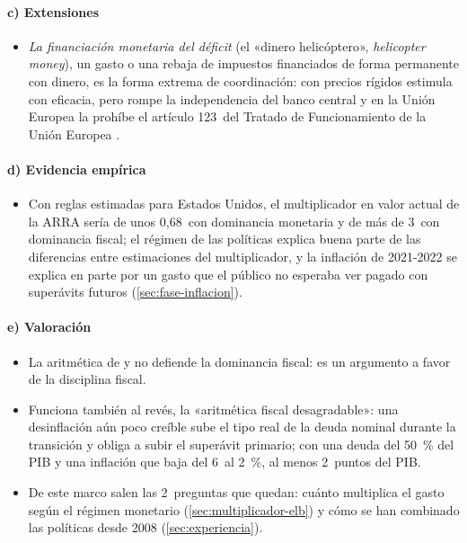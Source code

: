 \documentclass[11pt]{article}
\begin{document}
\paragraph{c) Extensiones}

\begin{itemize}
\item \emph{La financiación monetaria del déficit} (el «dinero helicóptero», \emph{helicopter money}), un gasto o una rebaja de impuestos financiados de forma permanente con dinero, es la forma extrema de coordinación: con precios rígidos estimula con eficacia\nocite{Gali2020Effects}, pero rompe la independencia del banco central y en la Unión Europea la prohíbe el artículo 123~del Tratado de Funcionamiento de la Unión Europea .
\end{itemize}

\paragraph{d) Evidencia empírica}

\begin{itemize}
\item Con reglas estimadas para Estados Unidos, el multiplicador en valor actual de la ARRA sería de unos 0,68~con dominancia monetaria y de más de 3~con dominancia fiscal\nocite{DavigLeeper2011Monetary}; el régimen de las políticas explica buena parte de las diferencias entre estimaciones del multiplicador\nocite{LeeperTraumWalker2017}, y la inflación de 2021-2022 se explica en parte por un gasto que el público no esperaba ver pagado con superávits futuros\nocite{BianchiFacciniMelosi2023} (\ref{sec:fase-inflacion}).
\end{itemize}

\paragraph{e) Valoración}

\begin{itemize}
\item La aritmética de  y  no defiende la dominancia fiscal: es un argumento a favor de la disciplina fiscal.
\item Funciona también al revés, la «aritmética fiscal desagradable»: una desinflación aún poco creíble sube el tipo real de la deuda nominal durante la transición y obliga a subir el superávit primario; con una deuda del 50~\% del PIB y una inflación que baja del 6~al 2~\%, al menos 2~puntos del PIB\nocite{King1995Commentary}.
\item De este marco salen las 2~preguntas que quedan: cuánto multiplica el gasto según el régimen monetario (\ref{sec:multiplicador-elb}) y cómo se han combinado las políticas desde 2008 (\ref{sec:experiencia}).
\end{itemize}
\end{document}
